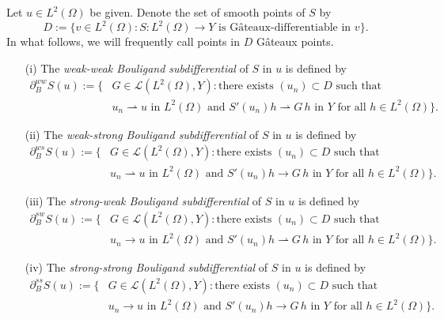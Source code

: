\documentclass[reqno]{shinyart}
\begin{document}
\begin{definition}\label{def:bouli}
    Let $u \in L^2(\Omega)$ be given. Denote the set of smooth points of $S$ by 
    \begin{equation*}
        D := \{ v\in L^2(\Omega) : \text{$S: L^2(\Omega) \to Y$ is G\^ateaux-differentiable in $v$}\}.
    \end{equation*} 
    In what follows, we will frequently call points in $D$ G\^ateaux points.
    \begin{itemize}
        \item[(i)] The \emph{weak-weak Bouligand subdifferential} of $S$ in $u$ is defined by
            \begin{align*} 
                \partial_{B}^{ww} S(u) 
                := \{ & G \in \mathcal{L}(L^2(\Omega), Y) : 
                    \text{there exists }  (u_n) \subset D \text{ such that}\\
                    & u_n {\rightharpoonup} u \text{ in } L^2(\Omega)
                \text{ and }  S'(u_n)h {\rightharpoonup} G\,h \text{ in } Y  \text{ for all } h \in L^2(\Omega)\}.
            \end{align*}
        \item[(ii)] The \emph{weak-strong Bouligand subdifferential} of $S$ in $u$ is defined by
            \begin{align*} 
                \partial_{B}^{ws} S(u) 
                := \{ & G \in \mathcal{L}(L^2(\Omega), Y) : 
                    \text{there exists }  (u_n) \subset D \text{ such that}\\
                    & u_n {\rightharpoonup} u \text{ in } L^2(\Omega)
                \text{ and }  S'(u_n)h \to G\,h \text{ in } Y  \text{ for all } h \in L^2(\Omega)\}.
            \end{align*}
        \item[(iii)] The \emph{strong-weak Bouligand subdifferential} of $S$ in $u$ is defined by
            \begin{align*} 
                \partial_{B}^{sw} S(u) 
                := \{ & G \in \mathcal{L}(L^2(\Omega), Y) : 
                    \text{there exists }  (u_n) \subset D \text{ such that}\\
                    & u_n \to u \text{ in } L^2(\Omega)
                \text{ and }  S'(u_n)h {\rightharpoonup} G\,h \text{ in } Y  \text{ for all } h \in L^2(\Omega)\}.
            \end{align*}
        \item[(iv)] The \emph{strong-strong Bouligand subdifferential} of $S$ in $u$ is defined by
            \begin{align*} 
                \partial_{B}^{ss} S(u) 
                := \{ & G \in \mathcal{L}(L^2(\Omega), Y) : 
                    \text{there exists }  (u_n) \subset D \text{ such that}\\
                    & u_n \to u \text{ in } L^2(\Omega)
                \text{ and }  S'(u_n)h \to G\,h \text{ in } Y  \text{ for all } h \in L^2(\Omega)\}.
            \end{align*}
    \end{itemize}
\end{definition}
\end{document}
